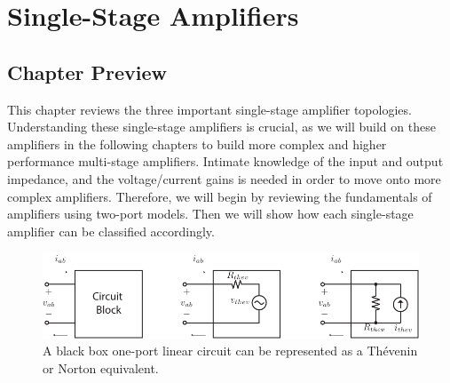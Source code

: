 \chapter{Single-Stage Amplifiers}
\label{ch:ch12_amps_single_stage}
\graphicspath{{./figures/figs_ch12_amps_single_stage/}}
\section{Chapter Preview}
This chapter reviews the three important single-stage amplifier topologies.  Understanding these single-stage amplifiers is crucial, as we will build on these amplifiers in the following chapters to build more complex and higher performance multi-stage amplifiers.  Intimate knowledge of the input and output impedance, and the voltage/current gains is needed in order to move onto more complex amplifiers.  Therefore, we will begin by reviewing the fundamentals of amplifiers using two-port models.  Then we will show how each single-stage amplifier can be classified accordingly.
\newpage
\begin{figure}[tb]
\centering
\includegraphics[scale=1]{oneports}
\caption{A black box one-port linear circuit can be represented as a Thévenin or Norton equivalent.}
\label{fig:oneports}
\end{figure}
